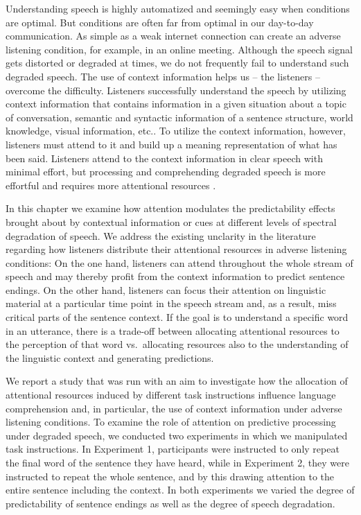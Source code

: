 \documentclass[a4paper, nobind]{templates/ociamthesis}
\begin{document}
Understanding speech is highly automatized and seemingly easy when conditions are optimal.
But conditions are often far from optimal in our day-to-day communication.
As simple as a weak internet connection can create an adverse listening condition, for example, in an online meeting.
Although the speech signal gets distorted or degraded at times, we do not frequently fail to understand such degraded speech.
The use of context information helps us -- the listeners -- overcome the difficulty.
Listeners successfully understand the speech by utilizing context information that contains information in a given situation about a topic of conversation, semantic and syntactic information of a sentence structure, world knowledge, visual information, etc.\autocites{Kaiser2004,Knoeferle2005,Altmann2007,Xiang2015}[for reviews,][]{Stilp2020}.
To utilize the context information, however, listeners must attend to it and build up a meaning representation of what has been said.
Listeners attend to the context information in clear speech with minimal effort, but processing and comprehending degraded speech is more effortful and requires more attentional resources \autocite{Wild2012,Eckert2016,Peelle2018}.

In this chapter we examine how attention modulates the predictability effects brought about by contextual information or cues at different levels of spectral degradation of speech.
We address the existing unclarity in the literature regarding how listeners distribute their attentional resources in adverse listening conditions:
On the one hand, listeners can attend throughout the whole stream of speech and may thereby profit from the context information to predict sentence endings.
On the other hand, listeners can focus their attention on linguistic material at a particular time point in the speech stream and, as a result, miss critical parts of the sentence context.
If the goal is to understand a specific word in an utterance, there is a trade-off between allocating attentional resources to the perception of that word vs.~allocating resources also to the understanding of the linguistic context and generating predictions.

We report a study that was run with an aim to investigate how the allocation of attentional resources induced by different task instructions influence language comprehension and, in particular, the use of context information under adverse listening conditions.
To examine the role of attention on predictive processing under degraded speech, we conducted two experiments in which we manipulated task instructions.
In Experiment 1, participants were instructed to only repeat the final word of the sentence they have heard,
while in Experiment 2, they were instructed to repeat the whole sentence, and by this drawing attention to the entire sentence including the context.
In both experiments we varied the degree of predictability of sentence endings as well as the degree of speech degradation.
\end{document}
